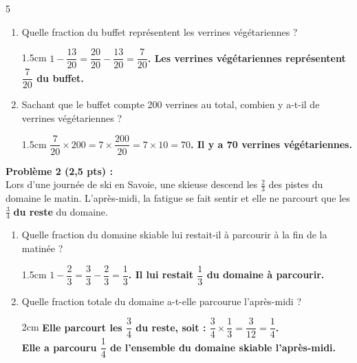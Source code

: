 \documentclass[a4paper]{book}
\begin{document}
{\begin{exerciceNote}{5}
\begin{enumerate}
            \item Quelle fraction du buffet représentent les verrines végétariennes ? 
            \begin{ZoneReponse}{1.5cm}
                \color{red}\bfseries
                $1 - \dfrac{13}{20} = \dfrac{20}{20} - \dfrac{13}{20} = \dfrac{7}{20}$. Les verrines végétariennes représentent $\dfrac{7}{20}$ du buffet.
            \end{ZoneReponse}
            
            \item Sachant que le buffet compte 200 verrines au total, combien y a-t-il de verrines végétariennes ?
            \begin{ZoneReponse}{1.5cm}
                \color{red}\bfseries
                $\dfrac{7}{20} \times 200 = 7 \times \dfrac{200}{20} = 7 \times 10 = 70$. Il y a 70 verrines végétariennes.
            \end{ZoneReponse}
        \end{enumerate}
    
        \medskip
        
        \textbf{Problème 2 (2,5 pts) :}\\
        Lors d'une journée de ski en Savoie, une skieuse descend les $\frac{2}{3}$ des pistes du domaine le matin. L'après-midi, la fatigue se fait sentir et elle ne parcourt que les $\frac{3}{4}$ \textbf{du reste} du domaine.
        \begin{enumerate}
            \item Quelle fraction du domaine skiable lui restait-il à parcourir à la fin de la matinée ? 
            \begin{ZoneReponse}{1.5cm}
                \color{red}\bfseries
                $1 - \dfrac{2}{3} = \dfrac{3}{3} - \dfrac{2}{3} = \dfrac{1}{3}$. Il lui restait $\dfrac{1}{3}$ du domaine à parcourir.
            \end{ZoneReponse}
            
            \item Quelle fraction totale du domaine a-t-elle parcourue l'après-midi ? 
            \begin{ZoneReponse}{2cm}
                \color{red}\bfseries
                Elle parcourt les $\dfrac{3}{4}$ du reste, soit : $\dfrac{3}{4} \times \dfrac{1}{3} = \dfrac{3}{12} = \dfrac{1}{4}$.\\
                Elle a parcouru $\dfrac{1}{4}$ de l'ensemble du domaine skiable l'après-midi.
            \end{ZoneReponse}
            

\end{enumerate}
\end{exerciceNote}}
\end{document}
